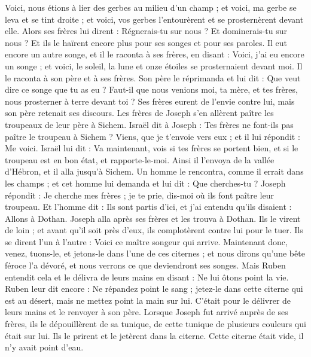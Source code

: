 \begin{multicols}{2}
Voici, nous étions à lier des gerbes au milieu d'un champ ; et voici, ma gerbe se leva et se tint droite ; et voici, vos gerbes l'entourèrent et se prosternèrent devant elle.
Alors ses frères lui dirent : Régnerais-tu sur nous ? Et dominerais-tu sur nous ? Et ils le haïrent encore plus pour ses songes et pour ses paroles.
Il eut encore un autre songe, et il le raconta à ses frères, en disant : Voici, j'ai eu encore un songe ; et voici, le soleil, la lune et onze étoiles se prosternaient devant moi.
Il le raconta à son père et à ses frères. Son père le réprimanda et lui dit : Que veut dire ce songe que tu as eu ? Faut-il que nous venions moi, ta mère, et tes frères, nous prosterner à terre devant toi ?
Ses frères eurent de l'envie contre lui, mais son père retenait ses discours.
Les frères de Joseph s'en allèrent paître les troupeaux de leur père à Sichem.
Israël dit à Joseph : Tes frères ne font-ils pas paître le troupeau à Sichem ? Viens, que je t'envoie vers eux ; et il lui répondit : Me voici.
Israël lui dit : Va maintenant, vois si tes frères se portent bien, et si le troupeau est en bon état, et rapporte-le-moi. Ainsi il l'envoya de la vallée d'Hébron, et il alla jusqu'à Sichem.
Un homme le rencontra, comme il errait dans les champs ; et cet homme lui demanda et lui dit : Que cherches-tu ?
Joseph répondit : Je cherche mes frères ; je te prie, dis-moi où ils font paître leur troupeau.
Et l'homme dit : Ils sont partis d'ici, et j'ai entendu qu'ils disaient : Allons à Dothan. Joseph alla après ses frères et les trouva à Dothan.
Ils le virent de loin ; et avant qu'il soit près d'eux, ils complotèrent contre lui pour le tuer.
Ils se dirent l'un à l'autre : Voici ce maître songeur qui arrive.
 Maintenant donc, venez, tuons-le, et jetons-le dans l'une de ces citernes ; et nous dirons qu'une bête féroce l'a dévoré, et nous verrons ce que deviendront ses songes.
Mais Ruben entendit cela et le délivra de leurs mains en disant : Ne lui ôtons point la vie.
Ruben leur dit encore : Ne répandez point le sang ; jetez-le dans cette citerne qui est au désert, mais ne mettez point la main sur lui. C'était pour le délivrer de leurs mains et le renvoyer à son père.
Lorsque Joseph fut arrivé auprès de ses frères, ils le dépouillèrent de sa tunique, de cette tunique de plusieurs couleurs qui était sur lui.
Ils le prirent et le jetèrent dans la citerne. Cette citerne était vide, il n'y avait point d'eau.

\end{multicols}
